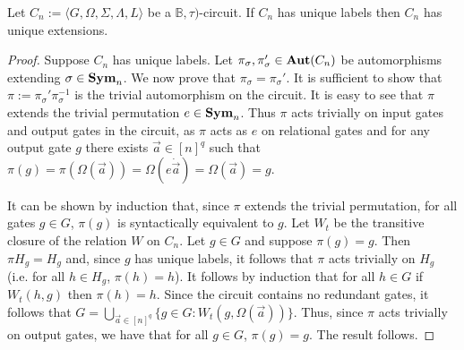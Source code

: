 \documentclass[../paper.tex]{subfiles}
\begin{document}
\begin{prop}
  Let $C_n := \langle G, \Omega, \Sigma, \Lambda, L\rangle$ be a $\mathbb{B},
  \tau)$-circuit. If $C_n$ has unique labels then $C_n$ has unique extensions.
  \label{prop:unique-labels-unique-extensions}
\end{prop}
\begin{proof}
  Suppose $C_n$ has unique labels. Let $\pi_{\sigma}, \pi_{\sigma}' \in
  \text{\textbf{Aut}}(C_n)$ be automorphisms extending $\sigma \in \text{\textbf{Sym}}_n$. We now prove that
  $\pi_\sigma = \pi_{\sigma}'$. It is sufficient to show that $\pi :=
  \pi_{\sigma}'\pi^{-1}_\sigma$ is the trivial automorphism on the circuit. It
  is easy to see that $\pi$ extends the trivial permutation $e \in \text{\textbf{Sym}}_n$. Thus
  $\pi$ acts trivially on input gates and output gates in the circuit, as $\pi$
  acts as $e$ on relational gates and for any output gate $g$ there exists
  $\vec{a} \in [n]^q$ such that $\pi (g) = \pi (\Omega(\vec{a})) = \Omega(e \dot
  \vec{a}) = \Omega(\vec{a}) = g$.

  It can be shown by induction that, since $\pi$ extends the trivial
  permutation, for all gates $g \in G$, $\pi(g)$ is syntactically equivalent to
  $g$. Let $W_t$ be the transitive closure of the relation $W$ on $C_n$. Let $g
  \in G$ and suppose $\pi (g) = g$. Then $\pi H_{g} = H_g$ and, since $g$ has
  unique labels, it follows that $\pi$ acts trivially on $H_g$ (i.e. for all $h
  \in H_{g}$, $\pi(h) = h$). It follows by induction that for all $h \in G$ if
  $W_t(h, g)$ then $\pi (h) = h$. Since the circuit contains no redundant gates,
  it follows that $G = \bigcup_{\vec{a} \in [n]^q} \{g \in G : W_t (g,
  \Omega(\vec{a}))\}$. Thus, since $\pi$ acts trivially on output gates, we have
  that for all $g \in G$, $\pi (g) = g$. The result follows.
    



\end{proof}
\end{document}
